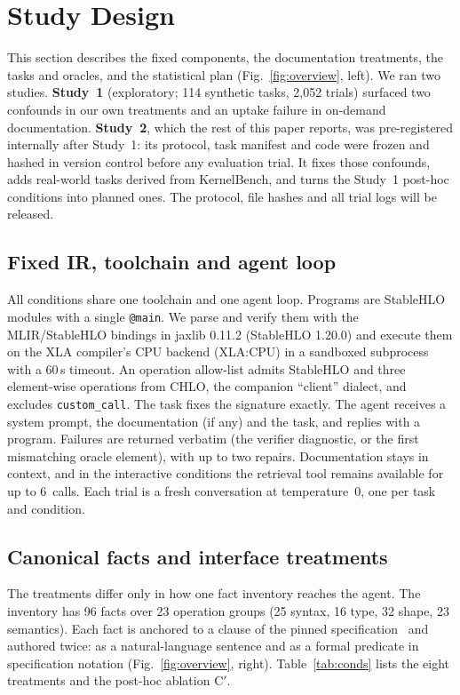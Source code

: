 \section{Study Design}\label{sec:design}
This section describes the fixed components, the documentation treatments, the tasks and oracles, and the statistical plan (Fig.~\ref{fig:overview}, left). We ran two studies. \textbf{Study~1} (exploratory; 114 synthetic tasks, 2{,}052 trials) surfaced two confounds in our own treatments and an uptake failure in on-demand documentation. \textbf{Study~2}, which the rest of this paper reports, was pre-registered internally after Study~1: its protocol, task manifest and code were frozen and hashed in version control before any evaluation trial. It fixes those confounds, adds real-world tasks derived from KernelBench, and turns the Study~1 post-hoc conditions into planned ones. The protocol, file hashes and all trial logs will be released.

\subsection{Fixed IR, toolchain and agent loop}
All conditions share one toolchain and one agent loop. Programs are StableHLO modules with a single \texttt{@main}. We parse and verify them with the MLIR/StableHLO bindings in jaxlib 0.11.2 (StableHLO 1.20.0) and execute them on the XLA compiler's CPU backend (XLA:CPU) in a sandboxed subprocess with a 60\,s timeout. An operation allow-list admits StableHLO and three element-wise operations from CHLO, the companion ``client'' dialect, and excludes \texttt{custom\_call}. The task fixes the signature exactly. The agent receives a system prompt, the documentation (if any) and the task, and replies with a program. Failures are returned verbatim (the verifier diagnostic, or the first mismatching oracle element), with up to two repairs. Documentation stays in context, and in the interactive conditions the retrieval tool remains available for up to 6~calls. Each trial is a fresh conversation at temperature~0, one per task and condition.

\subsection{Canonical facts and interface treatments}
The treatments differ only in how one fact inventory reaches the agent. The inventory has 96 facts over 23 operation groups (25 syntax, 16 type, 32 shape, 23 semantics). Each fact is anchored to a clause of the pinned specification~\cite{stablehlospec} and authored twice: as a natural-language sentence and as a formal predicate in specification notation (Fig.~\ref{fig:overview}, right). Table~\ref{tab:conds} lists the eight treatments and the post-hoc ablation C$'$.

